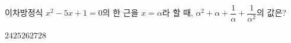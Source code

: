 이차방정식 $x^2-5x+1=0$의 한 근을 $x=\alpha$라 할 때, $\alpha^2+\alpha+\dfrac{1}{\alpha}+\dfrac{1}{\alpha^2}$의 값은?
\begin{choices32}{$24$}{$25$}{$26$}{$27$}{$28$}\end{choices32}
